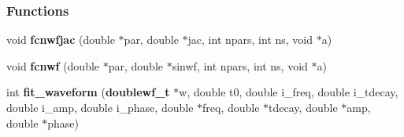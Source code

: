 \subsubsection*{Functions}
\begin{CompactItemize}
\item 
void \textbf{fcnwfjac} (double $\ast$par, double $\ast$jac, int npars, int ns, void $\ast$a)\label{fit__waveform_8c_ac9e9fe2657c440bf5233c9814c38593}

\item 
void \textbf{fcnwf} (double $\ast$par, double $\ast$sinwf, int npars, int ns, void $\ast$a)\label{fit__waveform_8c_fa81b65b6c5b6765251ace20bf9dfdc6}

\item 
int {\bf fit\_\-waveform} ({\bf doublewf\_\-t} $\ast$w, double t0, double i\_\-freq, double i\_\-tdecay, double i\_\-amp, double i\_\-phase, double $\ast$freq, double $\ast$tdecay, double $\ast$amp, double $\ast$phase)
\end{CompactItemize}
